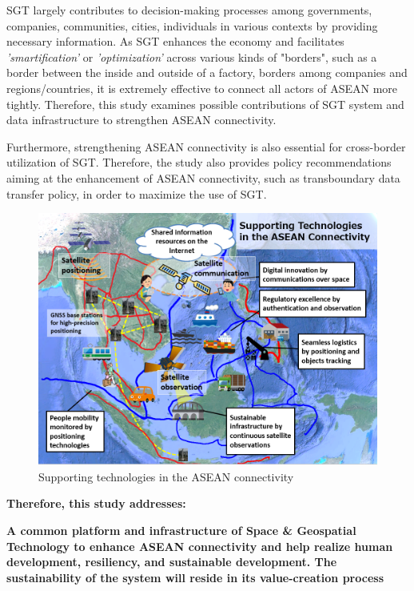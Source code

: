 \vspace{0.4 cm}

SGT largely contributes to decision-making processes among governments, companies, communities, cities, individuals in various contexts by providing necessary information. As SGT enhances the economy and facilitates \textit{'smartification'} or \textit{'optimization'} across various kinds of "borders", such as a border between the inside and outside of a factory, borders among companies and regions/countries, it is extremely effective to connect all actors of ASEAN more tightly. Therefore, this study examines possible contributions of SGT system and data infrastructure to strengthen ASEAN connectivity.

\vspace{0.4 cm}

Furthermore, strengthening ASEAN connectivity is also essential for cross-border utilization of SGT. Therefore, the study also provides policy recommendations aiming at the enhancement of ASEAN connectivity, such as transboundary data transfer policy, in order to maximize the use of SGT.

\begin{figure}[H]
\begin{center}
\includegraphics[width = 0.8\linewidth]{Figures/supp_connect.png}
\end{center}
\caption{Supporting technologies in the ASEAN connectivity}
\label{supp_connect}
\end{figure}

{\flushleft \bfseries Therefore, this study addresses:\par}
\vspace{0.2 cm}
{\bfseries A common platform and infrastructure of Space \& Geospatial Technology to enhance ASEAN connectivity and help realize human development, resiliency, and sustainable development. The sustainability of the system will reside in its value-creation process\par}

